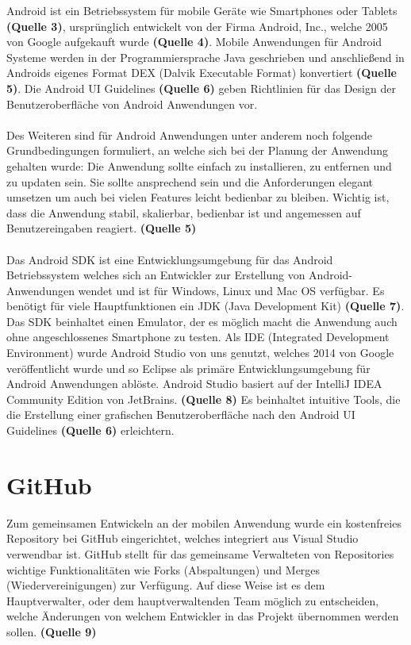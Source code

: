 Android ist ein Betriebssystem für mobile Geräte wie Smartphones oder Tablets \textbf{(Quelle 3)}, ursprünglich entwickelt von der Firma Android, Inc., welche 2005 von Google aufgekauft wurde \textbf{(Quelle 4)}. Mobile Anwendungen für Android Systeme werden in der Programmiersprache Java geschrieben und anschließend in Androids eigenes Format DEX (Dalvik Executable Format) konvertiert \textbf{(Quelle 5)}. Die Android UI Guidelines \textbf{(Quelle 6)} geben Richtlinien für das Design der Benutzeroberfläche von Android Anwendungen vor.
\\
\\
Des Weiteren sind für Android Anwendungen unter anderem noch folgende Grundbedingungen formuliert, an welche sich bei der Planung der Anwendung gehalten wurde: Die Anwendung sollte einfach zu installieren, zu entfernen und zu updaten sein. Sie sollte ansprechend sein und die Anforderungen elegant umsetzen um auch bei vielen Features leicht bedienbar zu bleiben. Wichtig ist, dass die Anwendung stabil, skalierbar, bedienbar ist und angemessen auf Benutzereingaben reagiert. \textbf{(Quelle 5)}
\\
\\
Das Android SDK ist eine Entwicklungsumgebung für das Android Betriebssystem welches sich an Entwickler zur Erstellung von Android-Anwendungen wendet und ist für Windows, Linux und Mac OS verfügbar. Es benötigt für viele Hauptfunktionen ein JDK (Java Development Kit) \textbf{(Quelle 7)}. Das SDK beinhaltet einen Emulator, der es möglich macht die Anwendung auch ohne angeschlossenes Smartphone zu testen. Als IDE (Integrated Development Environment) wurde Android Studio von uns genutzt, welches 2014 von Google veröffentlicht wurde und so Eclipse als primäre Entwicklungsumgebung für Android Anwendungen ablöste. Android Studio basiert auf der IntelliJ IDEA Community Edition von JetBrains. \textbf{(Quelle 8)} Es beinhaltet intuitive Tools, die die Erstellung einer grafischen Benutzeroberfläche nach den Android UI Guidelines \textbf{(Quelle 6)} erleichtern. 

\section{GitHub}

Zum gemeinsamen Entwickeln an der mobilen Anwendung wurde ein kostenfreies Repository bei GitHub eingerichtet, welches integriert aus Visual Studio verwendbar ist. GitHub stellt für das gemeinsame Verwalteten von Repositories wichtige Funktionalitäten wie Forks (Abspaltungen) und Merges (Wiedervereinigungen) zur Verfügung. Auf diese Weise ist es dem Hauptverwalter, oder dem hauptverwaltenden Team möglich zu entscheiden, welche Änderungen von welchem Entwickler in das Projekt übernommen werden sollen. \textbf{(Quelle 9)}

